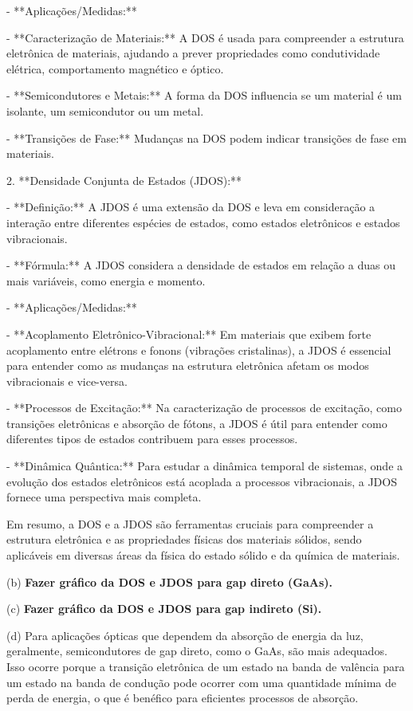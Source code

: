 \documentclass[a4paper,10pt]{article}
\begin{document}
   - **Aplicações/Medidas:**

     - **Caracterização de Materiais:** A DOS é usada para compreender a estrutura eletrônica de materiais, ajudando a prever propriedades como condutividade elétrica, comportamento magnético e óptico.

     - **Semicondutores e Metais:** A forma da DOS influencia se um material é um isolante, um semicondutor ou um metal.

     - **Transições de Fase:** Mudanças na DOS podem indicar transições de fase em materiais.


2. **Densidade Conjunta de Estados (JDOS):**

   - **Definição:** A JDOS é uma extensão da DOS e leva em consideração a interação entre diferentes espécies de estados, como estados eletrônicos e estados vibracionais.

   - **Fórmula:** A JDOS considera a densidade de estados em relação a duas ou mais variáveis, como energia e momento.

   - **Aplicações/Medidas:**

     - **Acoplamento Eletrônico-Vibracional:** Em materiais que exibem forte acoplamento entre elétrons e fonons (vibrações cristalinas), a JDOS é essencial para entender como as mudanças na estrutura eletrônica afetam os modos vibracionais e vice-versa.

     - **Processos de Excitação:** Na caracterização de processos de excitação, como transições eletrônicas e absorção de fótons, a JDOS é útil para entender como diferentes tipos de estados contribuem para esses processos.

     - **Dinâmica Quântica:** Para estudar a dinâmica temporal de sistemas, onde a evolução dos estados eletrônicos está acoplada a processos vibracionais, a JDOS fornece uma perspectiva mais completa.

Em resumo, a DOS e a JDOS são ferramentas cruciais para compreender a estrutura eletrônica e as propriedades físicas dos materiais sólidos, sendo aplicáveis em diversas áreas da física do estado sólido e da química de materiais.

\n

(b) \textbf{Fazer gráfico da DOS e JDOS para gap direto (GaAs).}

\n

(c) \textbf{Fazer gráfico da DOS e JDOS para gap indireto (Si).}

\n

(d) Para aplicações ópticas que dependem da absorção de energia da luz, geralmente, semicondutores de gap direto, como o GaAs, são mais adequados. Isso ocorre porque a transição eletrônica de um estado na banda de valência para um estado na banda de condução pode ocorrer com uma quantidade mínima de perda de energia, o que é benéfico para eficientes processos de absorção.
\end{document}
